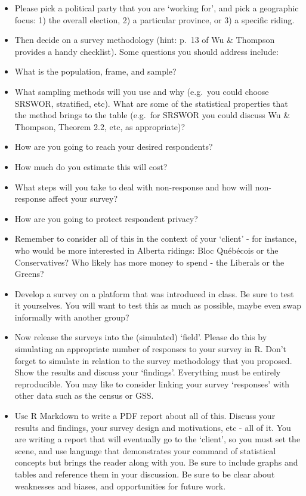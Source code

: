 \documentclass[
]{book}
\providecommand{\tightlist}{%
  \setlength{\itemsep}{0pt}\setlength{\parskip}{0pt}}
\begin{document}
\begin{itemize}
\tightlist
\item
  Please pick a political party that you are `working for', and pick a geographic focus: 1) the overall election, 2) a particular province, or 3) a specific riding.
\item
  Then decide on a survey methodology (hint: p.~13 of Wu \& Thompson provides a handy checklist). Some questions you should address include:
\item
  What is the population, frame, and sample?
\item
  What sampling methods will you use and why (e.g.~you could choose SRSWOR, stratified, etc). What are some of the statistical properties that the method brings to the table (e.g.~for SRSWOR you could discuss Wu \& Thompson, Theorem 2.2, etc, as appropriate)?
\item
  How are you going to reach your desired respondents?
\item
  How much do you estimate this will cost?
\item
  What steps will you take to deal with non-response and how will non-response affect your survey?
\item
  How are you going to protect respondent privacy?
\item
  Remember to consider all of this in the context of your `client' - for instance, who would be more interested in Alberta ridings: Bloc Québécois or the Conservatives? Who likely has more money to spend - the Liberals or the Greens?
\item
  Develop a survey on a platform that was introduced in class. Be sure to test it yourselves. You will want to test this as much as possible, maybe even swap informally with another group?
\item
  Now release the surveys into the (simulated) `field'. Please do this by simulating an appropriate number of responses to your survey in R. Don't forget to simulate in relation to the survey methodology that you proposed. Show the results and discuss your `findings'. Everything must be entirely reproducible. You may like to consider linking your survey `responses' with other data such as the census or GSS.
\item
  Use R Markdown to write a PDF report about all of this. Discuss your results and findings, your survey design and motivations, etc - all of it. You are writing a report that will eventually go to the `client', so you must set the scene, and use language that demonstrates your command of statistical concepts but brings the reader along with you. Be sure to include graphs and tables and reference them in your discussion. Be sure to be clear about weaknesses and biases, and opportunities for future work.

\end{itemize}
\end{document}
